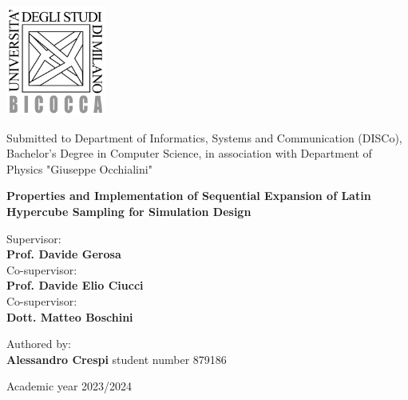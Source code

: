 \documentclass[12pt]{extarticle}
\renewcommand{\footnotesize}{\fontsize{10}{12}\selectfont}
\begin{document}
\begin{titlepage}
    \begin{center}
        \includegraphics[height=3.6cm]{./src/imgs/unimib_logo_2.png}
        \vspace*{1.45cm}

        \Large
        {Submitted to Department of Informatics, Systems and Communication (DISCo), Bachelor's Degree in Computer Science, in association with Department of Physics "Giuseppe Occhialini"}

        \vspace*{1.5cm}
        
        \Huge
        \textbf{Properties and Implementation of Sequential Expansion of Latin Hypercube Sampling for Simulation Design}

        \normalsize
        \vspace*{2cm}

        \begin{minipage}[t]{0.47\textwidth}
	       {Supervisor:} \vspace{0.3em} \\
              {\large \textbf{Prof. Davide Gerosa}} \vspace{1em}  \\
              {Co-supervisor:} \vspace{0.3em} \\
              {\large \textbf{Prof. Davide Elio Ciucci}}\\
              {Co-supervisor:} \vspace{0.3em} \\
              {\large \textbf{Dott. Matteo Boschini}}
        \end{minipage}
        \hfill
        \begin{minipage}[t]{0.47\textwidth}\raggedleft
	       {Authored by:} \hspace{-0.9em} \vspace{0.3em} \\
              {\large \textbf{Alessandro Crespi}}
              {\footnotesize student number 879186}
        \end{minipage}

        \vfill
        Academic year 2023/2024
            
    \end{center}
\end{titlepage}
\end{document}

